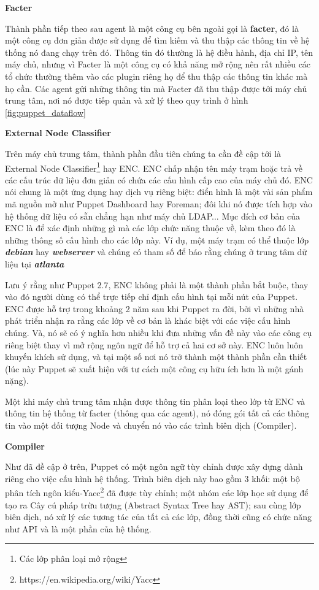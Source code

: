\textbf{\large Facter}


Thành phần tiếp theo sau agent là một công cụ bên ngoài gọi là \textbf{\textbf{facter}}, đó là một công cụ đơn giản được sử dụng để tìm kiếm và thu thập các thông tin về hệ thống nó đang chạy trên đó. Thông tin đó thường là hệ điều hành, địa chỉ IP, tên máy chủ, nhưng vì Facter là một công cụ có khả năng mở rộng nên rất nhiều các tổ chức thường thêm vào các plugin riêng họ để thu thập các thông tin khác mà họ cần. Các agent gửi những thông tin mà Facter đã thu thập được tới máy chủ trung tâm, nơi nó được tiếp quản và xử lý theo quy trình ở hình \ref{fig:puppet_dataflow}


\textbf{\large External Node Classifier}


Trên máy chủ trung tâm, thành phần đầu tiên chúng ta cần đề cập tới là External Node Classifier\footnote{Các lớp phân loại mở rộng} hay ENC. ENC chấp nhận tên máy trạm hoặc trả về các cấu trúc dữ liệu đơn giản có chứa các cấu hình cấp cao của máy chủ đó. ENC nói chung là một ứng dụng hay dịch vụ riêng biệt: điển hình là một vài sản phẩm mã nguồn mở như Puppet Dashboard hay Foreman; đôi khi nó được tích hợp vào hệ thống dữ liệu có sẵn chẳng hạn như máy chủ LDAP... Mục đích cơ bản của ENC là để xác định những gì mà các lớp chức năng thuộc về, kèm theo đó là những thông số cấu hình cho các lớp này. Ví dụ, một máy trạm có thể thuộc lớp \textbf{\textit{debian}} hay \textbf{\textit{webserver}} và chúng có tham số để báo rằng chúng ở trung tâm dữ liệu tại \textbf{\textit{atlanta}}

Lưu ý rằng như Puppet 2.7, ENC không phải là một thành phần bắt buộc, thay vào đó người dùng có thể trực tiếp chỉ định cấu hình tại mỗi nút của Puppet. ENC được hỗ trợ trong khoảng 2 năm sau khi Puppet ra đời, bởi vì những nhà phát triển nhận ra rằng các lớp về cơ bản là khác biệt với các việc cấu hình chúng. Và, nó sẽ có ý nghĩa hơn nhiều khi đưa những vấn đề này vào các công cụ riêng biệt thay vì mở rộng ngôn ngữ để hỗ trợ cả hai cơ sở này. ENC luôn luôn khuyến khích sử dụng, và tại một số nơi nó trở thành một thành phần cần thiết (lúc này Puppet sẽ xuất hiện với tư cách một công cụ hữu ích hơn là một gánh nặng).

Một khi máy chủ trung tâm nhận được thông tin phân loại theo lớp từ ENC và thông tin hệ thống từ facter (thông qua các agent), nó đóng gói tất cả các thông tin vào một đối tượng Node và chuyển nó vào các trình biên dịch (Compiler).


\textbf{\large Compiler}


Như đã đề cập ở trên, Puppet có một ngôn ngữ tùy chỉnh được xây dựng dành riêng cho việc cấu hình hệ thống. Trình biên dịch này bao gồm 3 khối: một bộ phân tích ngôn kiểu-Yacc\footnote{https://en.wikipedia.org/wiki/Yacc} đã được tùy chỉnh; một nhóm các lớp học sử dụng để tạo ra Cây cú pháp trừu tượng (Abstract Syntax Tree hay AST); sau cùng lớp biên dịch, nó xử lý các tương tác của tất cả các lớp, đồng thời cũng có chức năng như API và là một phần của hệ thống.


